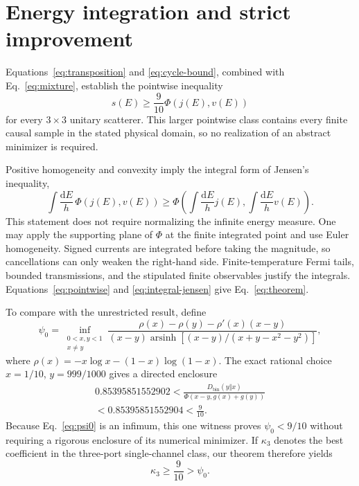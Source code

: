 \documentclass[aps,pra,reprint,superscriptaddress,nofootinbib,longbibliography,floatfix]{revtex4-2}
\newcommand{\dd}{\mathrm d}
\newcommand{\asinh}{\operatorname{arsinh}}
\newcommand{\Dkl}{D_{\mathrm{bin}}}
\newcommand{\PhiF}{\Phi}
\begin{document}
\section{Energy integration and strict improvement}
\label{sec:integration}

Equations~\eqref{eq:transposition} and \eqref{eq:cycle-bound}, combined with Eq.~\eqref{eq:mixture}, establish the pointwise inequality
\begin{equation}
 s(E)\geq\frac9{10}\PhiF(j(E),v(E))
 \label{eq:pointwise}
\end{equation}
for every $3\times3$ unitary scatterer.  This larger pointwise class contains every finite causal sample in the stated physical domain, so no realization of an abstract minimizer is required.

Positive homogeneity and convexity imply the integral form of Jensen's inequality,
\begin{equation}
 \int\frac{\dd E}{h}\,\PhiF(j(E),v(E))
 \geq\PhiF\!\left(\int\frac{\dd E}{h}j(E),
                    \int\frac{\dd E}{h}v(E)\right).
 \label{eq:integral-jensen}
\end{equation}
This statement does not require normalizing the infinite energy measure.  One may apply the supporting plane of $\PhiF$ at the finite integrated point and use Euler homogeneity.  Signed currents are integrated before taking the magnitude, so cancellations can only weaken the right-hand side.  Finite-temperature Fermi tails, bounded transmissions, and the stipulated finite observables justify the integrals.  Equations~\eqref{eq:pointwise} and \eqref{eq:integral-jensen} give Eq.~\eqref{eq:theorem}.

To compare with the unrestricted result, define \cite{BrandnerSaito2025}
\begin{equation}
 \psi_0=\inf_{\substack{0<x,y<1\\x\ne y}}
 \frac{\rho(x)-\rho(y)-\rho'(x)(x-y)}
 {(x-y)\asinh\!\left[(x-y)/(x+y-x^2-y^2)\right]},
 \label{eq:psi0}
\end{equation}
where $\rho(x)=-x\log x-(1-x)\log(1-x)$.  The exact rational choice $x=1/10$, $y=999/1000$ gives a directed enclosure
\begin{multline}
 0.85395851552902
 <\frac{\Dkl(y\Vert x)}{\PhiF(x-y,g(x)+g(y))}\\
 <0.85395851552904<\frac9{10}.
 \label{eq:psi-witness}
\end{multline}
Because Eq.~\eqref{eq:psi0} is an infimum, this one witness proves $\psi_0<9/10$ without requiring a rigorous enclosure of its numerical minimizer.  If $\kappa_3$ denotes the best coefficient in the three-port single-channel class, our theorem therefore yields
\begin{equation}
 \kappa_3\geq\frac9{10}>\psi_0.
 \label{eq:strict}
\end{equation}
\end{document}
